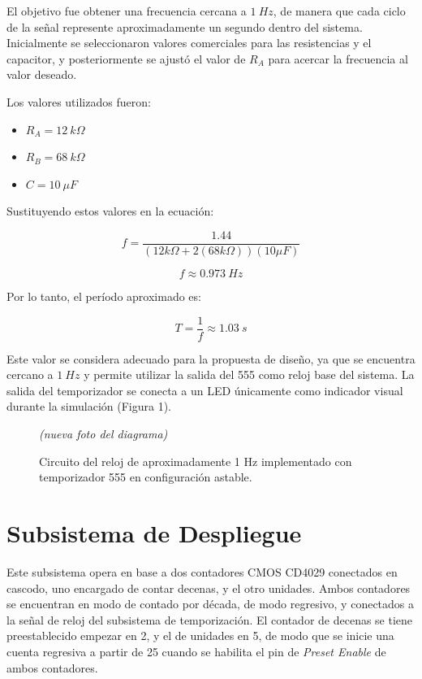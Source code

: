 \documentclass[12pt,onecolumn]{IEEEtran}
\begin{document}
El objetivo fue obtener una frecuencia cercana a $1~Hz$, de manera que cada ciclo de la señal represente aproximadamente un segundo dentro del sistema. Inicialmente se seleccionaron valores comerciales para las resistencias y el capacitor, y posteriormente se ajustó el valor de $R_A$ para acercar la frecuencia al valor deseado.

Los valores utilizados fueron:

\begin{itemize}
    \item $R_A = 12~k\Omega$
    \item $R_B = 68~k\Omega$
    \item $C = 10~\mu F$
\end{itemize}

Sustituyendo estos valores en la ecuación:

\begin{equation}
    f = \frac{1.44}{(12k\Omega + 2(68k\Omega))(10\mu F)}
\end{equation}

\begin{equation}
    f \approx 0.973~Hz
\end{equation}

Por lo tanto, el período aproximado es:

\begin{equation}
    T = \frac{1}{f} \approx 1.03~s
\end{equation}

Este valor se considera adecuado para la propuesta de diseño, ya que se encuentra cercano a $1~Hz$ y permite utilizar la salida del 555 como reloj base del sistema. La salida del temporizador se conecta a un LED únicamente como indicador visual durante la simulación (Figura 1).

\begin{figure}[H]
    \centering
    \begin{center}\textit{(nueva foto del diagrama)}\end{center}
    \caption{Circuito del reloj de aproximadamente 1 Hz implementado con temporizador 555 en configuración astable.}
    \label{fig:bloque1_555}
\end{figure}

\section{Subsistema de Despliegue}

Este subsistema opera en base a dos contadores CMOS CD4029 conectados en cascodo, uno encargado de contar decenas, y el otro unidades. Ambos contadores se encuentran en modo de contado por década, de modo regresivo, y conectados a la señal de reloj del subsistema de temporización. El contador de decenas se tiene preestablecido empezar en 2, y el de unidades en 5, de modo que se inicie una cuenta regresiva a partir de 25 cuando se habilita el pin de \textit{Preset Enable} de ambos contadores.
\end{document}
